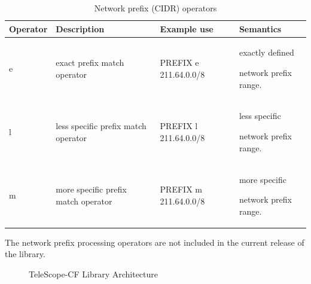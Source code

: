 \documentclass[11pt]{article} %
\begin{document}
\begin{table}[ht] 
\caption{Network prefix (CIDR) operators } %
\centering      %
\begin{tabular} %
{ | l | l | l | p{5cm} |}
\hline\hline                        %
Operator & Description & Example use & Semantics \\ [0.25ex] %
\hline                    %
e  & exact prefix match operator & PREFIX e 211.64.0.0/8 & exactly defined 

network prefix range. \\ \hline

l  & less specific prefix match operator & PREFIX l 211.64.0.0/8 & less specific


network prefix range. \\ \hline

m & more specific prefix match operator & PREFIX m 211.64.0.0/8 & more specific 

network prefix range.  \\ \hline
\end{tabular} 
\label{table:network prefix operators}  %
\end{table} 

The network prefix processing operators are not included in the current release of the library.


\begin{figure}[!htb]
\centering
{}
\caption{ TeleScope-CF Library Architecture}
\label{TeleScope-CF Library}
\end{figure}
\end{document}
